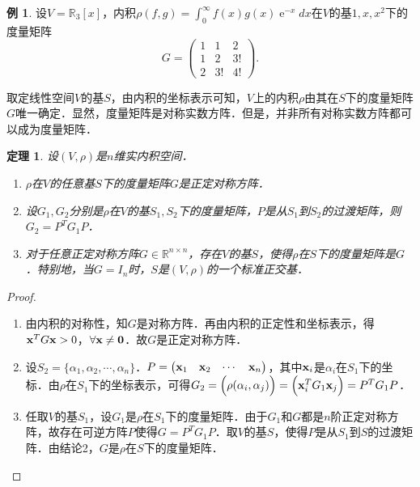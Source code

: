 \documentclass[a4paper,fontset=windows]{ctexbook}
\newtheorem{theorem}{定理}[chapter]
\theoremstyle{definition}
\newtheorem{example}{例}[chapter]
\DeclareMathOperator{\E}{e}
\begin{document}
\begin{example}\label{ex10.7}
设$V=\mathbb{R}_3[x]$，内积$\rho(f,g)=\int_0^{\infty}f(x)g(x)\E^{-x}dx$在$V$的基$1,x,x^2$下的度量矩阵
$$G=\begin{pmatrix}1&1&2 \\ 1&2&3! \\ 2&3!&4!\end{pmatrix}.$$
\end{example}

取定线性空间$V$的基$S$，由内积的坐标表示可知，$V$上的内积$\rho$由其在$S$下的度量矩阵$G$唯一确定．显然，度量矩阵是对称实数方阵．但是，并非所有对称实数方阵都可以成为度量矩阵．

\begin{theorem}\label{thm10.1}
设$(V,\rho)$是$n$维实内积空间．
\begin{enumerate}
\item $\rho$在$V$的任意基$S$下的度量矩阵$G$是正定对称方阵．

\item 设$G_1,G_2$分别是$\rho$在$V$的基$S_1,S_2$下的度量矩阵，$P$是从$S_1$到$S_2$的过渡矩阵，则$G_2=P^TG_1P$．

\item 对于任意正定对称方阵$G\in\mathbb{R}^{n\times n}$，存在$V$的基$S$，使得$\rho$在$S$下的度量矩阵是$G$．特别地，当$G=I_n$时，$S$是$(V,\rho)$的一个标准正交基．
\end{enumerate}
\end{theorem}

\begin{proof}~
\begin{enumerate}
\item 由内积的对称性，知$G$是对称方阵．再由内积的正定性和坐标表示，得${\bf x}^TG{\bf x}>0$，$\forall{\bf x\ne 0}$．故$G$是正定对称方阵．

\item 设$S_2=\{\alpha_1,\alpha_2,\cdots,\alpha_n\}$．$P=\begin{pmatrix}{\bf x}_1&{\bf x}_2&\cdots&{\bf x}_n\end{pmatrix}$，其中${\bf x}_i$是$\alpha_i$在$S_1$下的坐标．由$\rho$在$S_1$下的坐标表示，可得$G_2=\Bigl(\rho(\alpha_i,\alpha_j)\Bigr)=\Bigl({\bf x}_i^TG_1{\bf x}_j\Bigr)=P^TG_1P$．

\item 任取$V$的基$S_1$，设$G_1$是$\rho$在$S_1$下的度量矩阵．由于$G_1$和$G$都是$n$阶正定对称方阵，故存在可逆方阵$P$使得$G=P^TG_1P$．取$V$的基$S$，使得$P$是从$S_1$到$S$的过渡矩阵．由结论2，$G$是$\rho$在$S$下的度量矩阵．\qedhere
\end{enumerate}
\end{proof}
\end{document}
